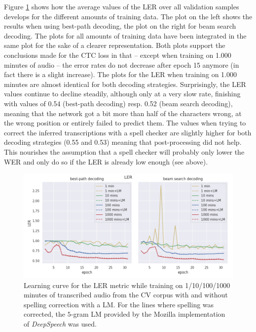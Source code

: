 Figure \ref{lc_ler_cv} shows how the average values of the \ac{LER} over all validation samples develops for the different amounts of training data. The plot on the left shows the results when using best-path decoding, the plot on the right for beam search decoding. The plots for all amounts of training data have been integrated in the same plot for the sake of a clearer representation. Both plots support the conclusions made for the CTC loss in that -- except when training on 1.000 minutes of audio -- the error rates do not decrease after epoch 15 anymore (in fact there is a slight increase). The plots for the \ac{LER} when training on 1.000 minutes are almost identical for both decoding strategies. Surprisingly, the \ac{LER} values continue to decline steadily, although only at a very slow rate, finishing with values of 0.54 (best-path decoding) resp. 0.52 (beam search decoding), meaning that the network got a bit more than half of the characters wrong, at the wrong position or entirely failed to predict them. The values when trying to correct the inferred transcriptions with a spell checker are slightly higher for both decoding strategies (0.55 and 0.53) meaning that post-processing did not help. This nourishes the assumption that a spell checker will probably only lower the \ac{WER} and only do so if the \ac{LER} is already low enough (see above).

\begin{figure}[h!]
	\includegraphics[width=\linewidth]{./img/lc_ler_cv.png}
	\caption{Learning curve for the \ac{LER} metric while training on 1/10/100/1000 minutes of transcribed audio from the \ac{CV} corpus with and without spelling correction with a \ac{LM}. For the lines where spelling was corrected, the $5$-gram \ac{LM} provided by the Mozilla implementation of \textit{DeepSpeech} was used.}
	\label{lc_ler_cv}
\end{figure}

